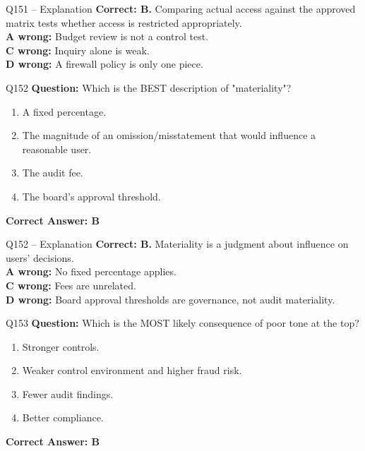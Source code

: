\documentclass[aspectratio=169,10pt]{beamer}
\begin{document}
	\begin{frame}[t]{Q151 -- Explanation}
		\small
		\textbf{Correct: B.} Comparing actual access against the approved matrix tests whether access is restricted appropriately. \\[4pt]
		\textbf{A wrong:} Budget review is not a control test. \\[2pt]
		\textbf{C wrong:} Inquiry alone is weak. \\[2pt]
		\textbf{D wrong:} A firewall policy is only one piece.
	\end{frame}
	
	\begin{frame}[t]{Q152}
		\small
		\textbf{Question:} Which is the BEST description of "materiality"?
		\begin{enumerate}[label=\Alph*.,itemsep=1pt,topsep=2pt]
			\item A fixed percentage.
			\item The magnitude of an omission/misstatement that would influence a reasonable user.
			\item The audit fee.
			\item The board's approval threshold.
		\end{enumerate}
		\vspace{4pt}
		\textbf{Correct Answer: B}
	\end{frame}
	
	\begin{frame}[t]{Q152 -- Explanation}
		\small
		\textbf{Correct: B.} Materiality is a judgment about influence on users' decisions. \\[4pt]
		\textbf{A wrong:} No fixed percentage applies. \\[2pt]
		\textbf{C wrong:} Fees are unrelated. \\[2pt]
		\textbf{D wrong:} Board approval thresholds are governance, not audit materiality.
	\end{frame}
	
	\begin{frame}[t]{Q153}
		\small
		\textbf{Question:} Which is the MOST likely consequence of poor tone at the top?
		\begin{enumerate}[label=\Alph*.,itemsep=1pt,topsep=2pt]
			\item Stronger controls.
			\item Weaker control environment and higher fraud risk.
			\item Fewer audit findings.
			\item Better compliance.
		\end{enumerate}
		\vspace{4pt}
		\textbf{Correct Answer: B}
	\end{frame}
	
\end{document}

